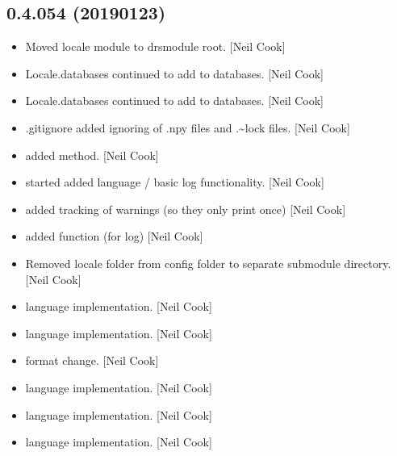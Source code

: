 \documentclass[a4paper,10pt,english]{report}
\begin{document}
\subsection{0.4.054 (2019\sphinxhyphen{}01\sphinxhyphen{}23)}
\label{\detokenize{misc/changelog:id228}}\begin{itemize}
\item {} 
Moved locale module to drsmodule root. {[}Neil Cook{]}

\item {} 
Locale.databases \sphinxhyphen{} continued to add to databases. {[}Neil Cook{]}

\item {} 
Locale.databases \sphinxhyphen{} continued to add to databases. {[}Neil Cook{]}

\item {} 
.gitignore \sphinxhyphen{} added ignoring of .npy files and .\textasciitilde{}lock files. {[}Neil
Cook{]}

\item {} 
 \sphinxhyphen{} added  method. {[}Neil
Cook{]}

\item {} 
 \sphinxhyphen{} started added language / basic log
functionality. {[}Neil Cook{]}

\item {} 
 \sphinxhyphen{} added tracking of warnings (so
they only print once) {[}Neil Cook{]}

\item {} 
 \sphinxhyphen{} added  function (for log) {[}Neil
Cook{]}

\item {} 
Removed locale folder from config folder to separate sub\sphinxhyphen{}module
directory. {[}Neil Cook{]}

\item {} 
 \sphinxhyphen{} language implementation.
{[}Neil Cook{]}

\item {} 
 \sphinxhyphen{} language implementation.
{[}Neil Cook{]}

\item {} 
 \sphinxhyphen{} format change. {[}Neil Cook{]}

\item {} 
 \sphinxhyphen{} language implementation. {[}Neil Cook{]}

\item {} 
 \sphinxhyphen{} language implementation. {[}Neil Cook{]}

\item {} 
 \sphinxhyphen{} language implementation. {[}Neil Cook{]}

\end{itemize}
\end{document}
